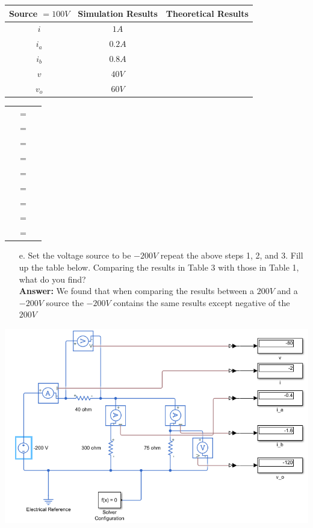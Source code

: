 \documentclass[a4paper]{article}
\begin{document}
\begin{itemize}
	      \begin{tabular}{|c|c|c|}
	      	\hline
	      	Source $= 100 V$ & Simulation Results & Theoretical Results \\
	      	\hline
	      	$i$              & $1A$               &                     \\
	      	\hline
	      	$i_{a}$          & $0.2A$             &                     \\
	      	\hline
	      	$i_{b}$          & $0.8A$             &                     \\
	      	\hline
	      	$v$              & $40V$              &                     \\
	      	\hline
	      	$v_{o}$          & $60V$              &                     \\
	      	\hline
          \end{tabular} 
          \begin{tabular}{rcl}
            & $=$ &   \\
            & $=$ &   \\
            & $=$ &   \\
            & $=$ &   \\
            & $=$ &   \\
            & $=$ &   \\
            & $=$ &   \\
            & $=$ &   \\
            & $=$ &   \\
      \end{tabular}
	      \begin{itemize}
	      	\item[e.] Set the voltage source to be $-200V$ repeat the above steps 1, 2, and 3. Fill up the table below. Comparing the results in Table 3 with those in Table 1, what do you find? \\
	      	      \textbf{Answer:} We found that when comparing the results between a $200V$ and a $-200V$ source the $-200V$ contains the same results except negative of the $200V$
	      \end{itemize}
	      \includegraphics[scale=0.5]{circuit-1-200.png} \\

\end{itemize}
\end{document}
